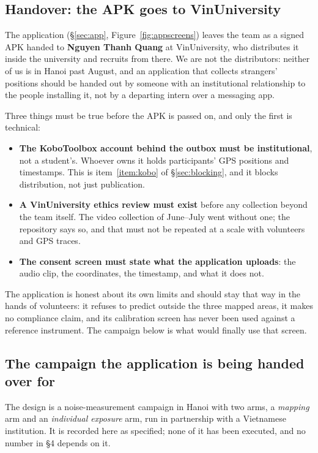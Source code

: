 \documentclass[11pt,a4paper]{article}
\begin{document}
\subsection{Handover: the APK goes to VinUniversity}\label{sec:handover}

The application (§\ref{sec:app}, Figure~\ref{fig:appscreens}) leaves the team as
a signed APK handed to \textbf{Nguyen Thanh Quang} at VinUniversity, who
distributes it inside the university and recruits from there. We are not the
distributors: neither of us is in Hanoi past August, and an application that
collects strangers' positions should be handed out by someone with an
institutional relationship to the people installing it, not by a departing
intern over a messaging app.

Three things must be true before the APK is passed on, and only the first is
technical:

\begin{itemize}
 \item \textbf{The KoboToolbox account behind the outbox must be
 institutional}, not a student's. Whoever owns it holds participants' GPS
 positions and timestamps. This is item~\ref{item:kobo} of §\ref{sec:blocking}, and it blocks
 distribution, not just publication.
 \item \textbf{A VinUniversity ethics review must exist} before any collection
 beyond the team itself. The video collection of June--July went without
 one; the repository says so, and that must not be repeated at a scale
 with volunteers and GPS traces.
 \item \textbf{The consent screen must state what the application uploads}: the audio clip, the coordinates, the timestamp, and what it does not.
\end{itemize}

The application is honest about its own limits and should stay that way in the
hands of volunteers: it refuses to predict outside the three mapped areas, it
makes no compliance claim, and its calibration screen has never been used
against a reference instrument. The campaign below is what would finally use
that screen.

\subsection{The campaign the application is being handed over
for}\label{sec:campaign}

The design is a noise-measurement campaign in Hanoi with two arms, a
\emph{mapping} arm and an \emph{individual exposure} arm, run in partnership
with a Vietnamese institution. It is recorded here as specified; none of it has
been executed, and no number in §4 depends on it.
\end{document}
